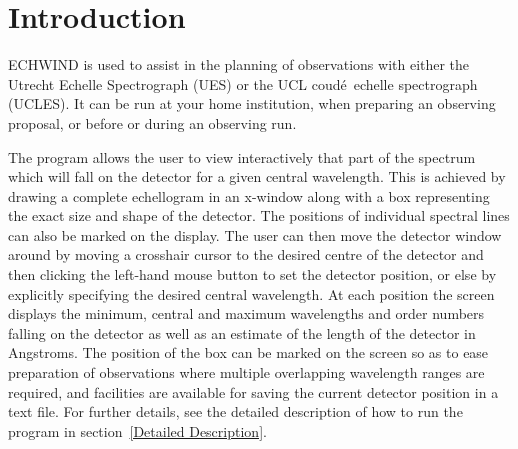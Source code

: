 \documentclass[11pt]{article}
\newcommand{\stardocinitials}  {SUN}
\newcommand{\stardocnumber}    {53.3}
\newcommand{\stardocname}{\stardocinitials /\stardocnumber}
\newenvironment{latexonly}{}{}
\newcommand{\latexonlytoc}[0]{\tableofcontents}
\renewcommand{\thepage}{\roman{page}}
\begin{document}
 \newpage
 \begin{latexonly}
   \setlength{\parskip}{0mm}
   \latexonlytoc
   \setlength{\parskip}{\medskipamount}
   \markright{\stardocname}
 \end{latexonly}
\newpage
\renewcommand{\thepage}{\arabic{page}}
\setcounter{page}{1}
\newcommand{\coude}{coud\'{e}}

\section{Introduction}

ECHWIND is used to assist in the planning of observations with either the
Utrecht Echelle Spectrograph (UES) or the UCL \coude\ echelle spectrograph
(UCLES). It can be run at your home institution, when preparing an observing
proposal, or before or during an observing run.

The program allows the user to view interactively that part of the spectrum
which will fall on the detector for a given central wavelength. This is
achieved by drawing a complete echellogram in an x-window along with a box
representing the exact size and shape of the detector. The positions of
individual spectral lines can also be marked on the display. The user can
then move the detector window around by moving a crosshair cursor to the
desired centre of the detector and then clicking the left-hand mouse button
to set the detector position, or else by explicitly specifying the desired
central wavelength. At each position the screen displays the minimum,
central and maximum wavelengths and order numbers falling on the detector
as well as an estimate of the length of the detector in Angstroms.  The
position of the box can be marked on the screen so as to ease preparation
of observations where multiple overlapping wavelength ranges are required,
and facilities are available for saving the current detector position in a
text file. For further details, see the detailed description of how to run
the program in section~\ref{Detailed Description}.
\end{document}

